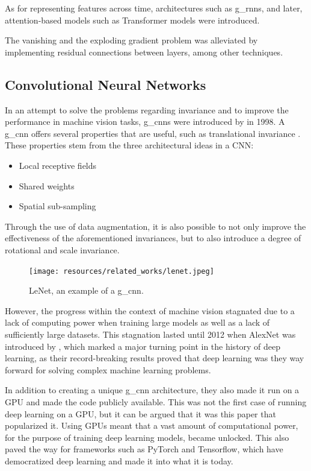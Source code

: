 \par
As for representing features across time, architectures such as \glspl*{g_rnn}\cite{lstm,gru}, and later, attention\cite{attention}-based models such as Transformer\cite{transformer} models were introduced.\par
The vanishing and the exploding gradient problem was alleviated by implementing residual connections\cite{resnet} between layers, among other techniques.
\subsection{Convolutional Neural Networks}
In an attempt to solve the problems regarding invariance and to improve the performance in machine vision tasks, \glspl*{g_cnn} were introduced by \textcite{cnn} in 1998. A \gls*{g_cnn} offers several properties that are useful, such as translational invariance \cite{cnn}. These properties stem from the three architectural ideas in a CNN:
\begin{itemize}
    \item Local receptive fields
    \item Shared weights
    \item Spatial sub-sampling
\end{itemize}
Through the use of data augmentation, it is also possible to not only improve the effectiveness of the aforementioned invariances, but to also introduce a degree of rotational and scale invariance.
\begin{figure}[H]
    \centering
    \texttt{[image: resources/related\_works/lenet.jpeg]}
    \caption{LeNet\cite{cnn}, an example of a \gls*{g_cnn}.}
\end{figure}
\par
However, the progress within the context of machine vision stagnated due to a lack of computing power when training large models as well as a lack of sufficiently large datasets. This stagnation lasted until 2012 when AlexNet was introduced by \textcite{alexnet}, which marked a major turning point in the history of deep learning, as their record-breaking results proved that deep learning was they way forward for solving complex machine learning problems.
\par
In addition to creating a unique \gls*{g_cnn} architecture, they also made it run on a GPU and made the code publicly available. This was not the first case of running deep learning on a GPU\cite{deeplearning_gpu}, but it can be argued that it was this paper that popularized it.  Using GPUs meant that a vast amount of computational power, for the purpose of training deep learning models, became unlocked. This also paved the way for frameworks such as PyTorch\cite{pytorch} and Tensorflow\cite{tensorflow}, which have democratized deep learning and made it into what it is today.
